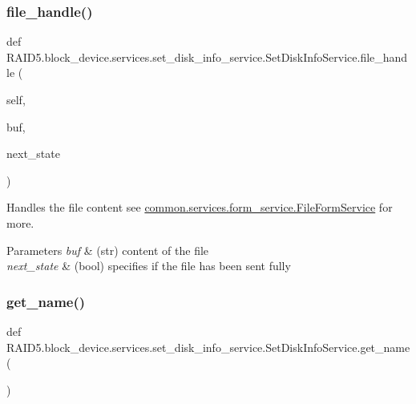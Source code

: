 \subsubsection{\texorpdfstring{file\+\_\+handle()}{file\_handle()}}
{\footnotesize\ttfamily def R\+A\+I\+D5.\+block\+\_\+device.\+services.\+set\+\_\+disk\+\_\+info\+\_\+service.\+Set\+Disk\+Info\+Service.\+file\+\_\+handle (\begin{DoxyParamCaption}\item[{}]{self,  }\item[{}]{buf,  }\item[{}]{next\+\_\+state }\end{DoxyParamCaption})}



Handles the file content see \hyperlink{class_r_a_i_d5_1_1common_1_1services_1_1form__service_1_1_file_form_service}{common.\+services.\+form\+\_\+service.\+File\+Form\+Service} for more. 


\begin{DoxyParams}{Parameters}
{\em buf} & (str) content of the file \\
\hline
{\em next\+\_\+state} & (bool) specifies if the file has been sent fully \\
\hline
\end{DoxyParams}
\mbox{\label{class_r_a_i_d5_1_1block__device_1_1services_1_1set__disk__info__service_1_1_set_disk_info_service_a72eea80f2a7dea81f2a9b3afcb0e67a2}} 
\subsubsection{\texorpdfstring{get\+\_\+name()}{get\_name()}}
{\footnotesize\ttfamily def R\+A\+I\+D5.\+block\+\_\+device.\+services.\+set\+\_\+disk\+\_\+info\+\_\+service.\+Set\+Disk\+Info\+Service.\+get\+\_\+name (\begin{DoxyParamCaption}{ }\end{DoxyParamCaption})\hspace{0.3cm}{\ttfamily [static]}}




